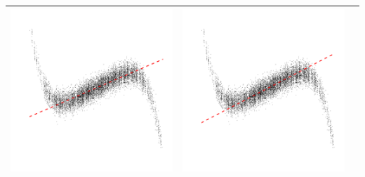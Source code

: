 \documentclass{beamer}
\begin{document}
\begin{frame}
\begin{center}
\begin{tabular}{c|c|c}
\includegraphics[scale = 0.2]{plot_loss_3.pdf} &
\includegraphics[scale = 0.2]{plot_loss_20.pdf} \\ \hline
\end{tabular}
\end{center}
\end{frame}
\end{document}
